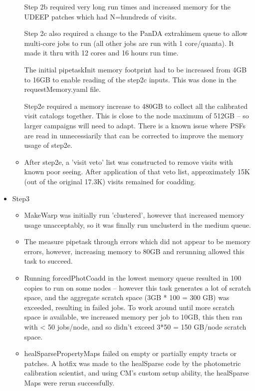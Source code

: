 \begin{itemize}
\begin{itemize}
	Step 2b required very long run times and increased memory 
	for the UDEEP patches which had N=hundreds of visits.

	Step 2c also required a change to the PanDA extrahimem queue
	to allow multi-core jobs to run (all other jobs are run 
	with 1 core/quanta).  It made it thru with 12 cores and 16 hours
	run time.

	The initial pipetaskInit memory footprint had to be increased from
	4GB to 16GB to enable reading of the step2c inputs. This
	was done in the requestMemory.yaml file.

	Step2e required a memory increase to 480GB to collect all the
	calibrated visit catalogs together. This is close to the 
	node maximum of 512GB -- so larger campaigns will need to adapt.
	There is a known issue where PSFs are read in unnecessiarily that
	can be corrected to improve the memory usage of step2e.

\item 
	After step2e, a 'visit veto' list was constructed to remove
	visits with known poor seeing.  After application of that 
	veto list, approximately 15K (out of the original 17.3K) visits
	remained for coadding.

\end{itemize} %

\item Step3
\begin{itemize}

  \item
	 MakeWarp was initially run 'clustered', however that increased memory
	usage unacceptably, so it was finally run unclusterd in the medium 
	queue.

  \item
	  The measure pipetask through errors which did not appear to be
	memory errors, however, increasing memory to 80GB and rerunning
	allowed this task to succeed.

  \item
	Running forcedPhotCoadd in the lowest memory queue resulted in
	100 copies to run on some nodes -- however this task generates a lot
	of scratch space, and the aggregate scratch space (3GB * 100 = 300 GB)
	was exceeded, resulting in failed jobs.
	To work around until more scratch space is available, we increased
	memory per job to 10GB, this then ran with < 50 jobs/node, and so
	didn't exceed 3*50 = 150 GB/node scratch space.

  \item
	  healSparsePropertyMaps failed on empty or partially empty tracts
	or patches.  A hotfix was made to the healSparse code by the photometric
	calibration scientist,  and using CM's custom setup ability, 
	the healSparse Maps were rerun successfully.


\end{itemize}
\end{itemize}
